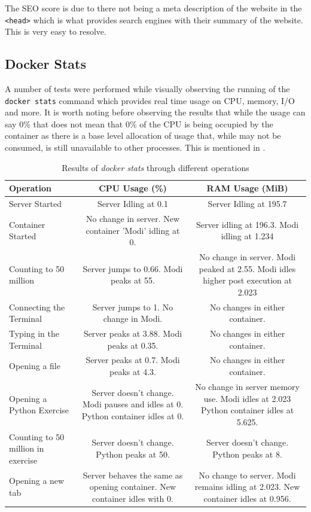 The SEO score is due to there not being a meta description of the website in the \texttt{<head>} which is what provides search engines with their summary of the website. This is very easy to resolve. 

\subsection{Docker Stats}

A number of tests were performed while visually observing the running of the \texttt{docker stats} command which provides real time usage on CPU, memory, I/O and more. It is worth noting before observing the results that while the usage can say 0\% that does not mean that 0\% of the CPU is being occupied by the container as there is a base level allocation of usage that, while may not be consumed, is still unavailable to other processes. This is mentioned in \cite{docker-perf}.

\begin{table}[h!]
    \centering
    \begin{tabulary}{\textwidth}{L|C|C}
        \textbf{Operation} & \textbf{CPU Usage (\%)} & \textbf{RAM Usage (MiB)}\\
        \hline
        Server Started & Server Idling at 0.1 & Server Idling at 195.7\\
        \hline
        Container Started & No change in server. New container 'Modi' idling at 0. & Server idling at 196.3. Modi idling at 1.234\\
        \hline
        Counting to 50 million & Server jumps to 0.66. Modi peaks at 55. & No change in server. Modi peaked at 2.55. Modi idles higher post execution at 2.023\\
        \hline
        Connecting the Terminal & Server jumps to 1. No change in Modi. & No changes in either container.\\
        \hline
        Typing in the Terminal & Server peaks at 3.88. Modi peaks at 0.35. & No changes in either container.\\
        \hline
        Opening a file & Server peaks at 0.7. Modi peaks at 4.3. & No changes in either container.\\
        \hline
        Opening a Python Exercise & Server doesn't change. Modi pauses and idles at 0. Python container idles at 0. & No change in server memory use. Modi idles at 2.023 Python container idles at 5.625.\\
        \hline
        Counting to 50 million in exercise & Server doesn't change. Python peaks at 50. & Server doesn't change. Python peaks at 8.\\
        \hline
        Opening a new tab & Server behaves the same as opening container. New container idles with 0. & No change to server. Modi remains idling at 2.023. New container idles at 0.956.
    \end{tabulary}
    \caption{Results of \textit{docker stats} through different operations}
\end{table}

